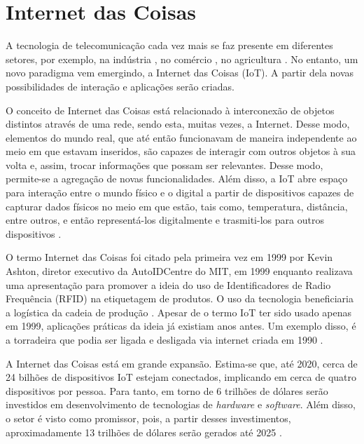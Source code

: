 \chapter{Internet das Coisas}
\label{cap:internet_of_things}



A tecnologia de telecomunicação cada vez mais se faz presente em diferentes setores, por exemplo, na indústria \cite{Fernandes2013}, no comércio \cite{Carmona2014}, no agricultura \cite{Quadros2011}. No entanto, um novo paradigma vem emergindo, a Internet das Coisas (IoT). A partir dela novas possibilidades de interação e aplicações serão criadas.


O conceito de Internet das Coisas está relacionado à interconexão de objetos distintos através de uma rede, sendo esta, muitas vezes, a Internet. Desse modo, elementos do mundo real, que até então funcionavam de maneira independente ao meio em que estavam inseridos, são capazes de interagir com outros objetos à sua volta e, assim, trocar informações que possam ser relevantes. Desse modo, permite-se a agregação de novas funcionalidades. Além disso, a IoT abre espaço para interação entre o mundo físico e o digital a partir de dispositivos capazes de capturar dados físicos no meio em que estão, tais como, temperatura, distância, entre outros, e então representá-los digitalmente e trasmiti-los para outros dispositivos \cite{Suresh2014}.

O termo Internet das Coisas foi citado pela primeira vez em 1999 por Kevin Ashton, diretor executivo da AutoIDCentre do MIT, em 1999 enquanto realizava uma apresentação para promover a ideia do uso de Identificadores de Radio Frequência (RFID) na etiquetagem de produtos. O uso da tecnologia beneficiaria a logística da cadeia de produção \cite{Finep2015}. Apesar de o termo IoT ter sido usado apenas em 1999, aplicações práticas da ideia já existiam anos antes. Um exemplo disso, é a torradeira que podia ser ligada e desligada via internet criada em 1990 \cite{Suresh2014}.

A Internet das Coisas está em grande expansão. Estima-se que, até 2020, cerca de 24 bilhões de dispositivos IoT estejam conectados, implicando em cerca de quatro dispositivos por pessoa. Para tanto, em torno de 6 trilhões de dólares serão investidos em desenvolvimento de tecnologias de \textit{hardware} e \textit{software}. Além disso, o setor é visto como promissor, pois, a partir desses investimentos, aproximadamente 13 trilhões de dólares serão gerados até 2025 \cite{Meola2016}.

